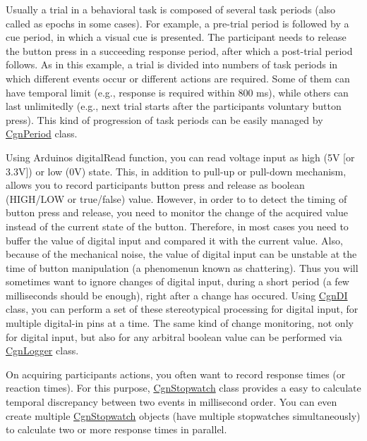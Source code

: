 Usually a trial in a behavioral task is composed of several task periods (also called as epochs in some cases). For example, a pre-\/trial period is followed by a cue period, in which a visual cue is presented. The participant needs to release the button press in a succeeding response period, after which a post-\/trial period follows. As in this example, a trial is divided into numbers of task periods in which different events occur or different actions are required. Some of them can have temporal limit (e.\+g., response is required within 800 ms), while others can last unlimitedly (e.\+g., next trial starts after the participant\textquotesingle{}s voluntary button press). This kind of progression of task periods can be easily managed by \hyperlink{classCgnPeriod}{Cgn\+Period} class.

Using Arduino\textquotesingle{}s {\ttfamily digital\+Read} function, you can read voltage input as high (5V \mbox{[}or 3.\+3V\mbox{]}) or low (0V) state. This, in addition to pull-\/up or pull-\/down mechanism, allows you to record participant\textquotesingle{}s button press and release as boolean ({\ttfamily H\+I\+G\+H/\+L\+OW} or {\ttfamily true/false}) value. However, in order to to detect the timing of button press and release, you need to monitor the change of the acquired value instead of the current state of the button. Therefore, in most cases you need to buffer the value of digital input and compared it with the current value. Also, because of the mechanical noise, the value of digital input can be unstable at the time of button manipulation (a phenomenun known as chattering). Thus you will sometimes want to ignore changes of digital input, during a short period (a few milliseconds should be enough), right after a change has occured. Using \hyperlink{classCgnDI}{Cgn\+DI} class, you can perform a set of these stereotypical processing for digital input, for multiple digital-\/in pins at a time. The same kind of change monitoring, not only for digital input, but also for any arbitral boolean value can be performed via \hyperlink{classCgnLogger}{Cgn\+Logger} class.

On acquiring participant\textquotesingle{}s actions, you often want to record response times (or reaction times). For this purpose, \hyperlink{classCgnStopwatch}{Cgn\+Stopwatch} class provides a easy to calculate temporal discrepancy between two events in millisecond order. You can even create multiple \hyperlink{classCgnStopwatch}{Cgn\+Stopwatch} objects (have multiple stopwatches simultaneously) to calculate two or more response times in parallel.

